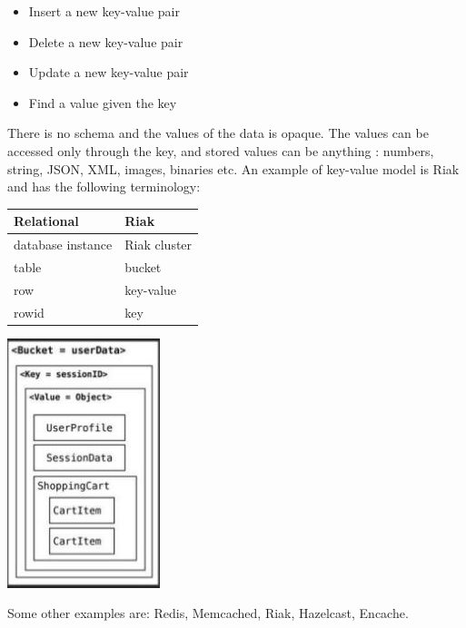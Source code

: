 \documentclass[a4page, 11pt]{article}
\begin{document}
\begin{itemize}[noitemsep]
	\item
	Insert a new key-value pair
	\item
	Delete a new key-value pair
	\item
	Update a new key-value pair
	\item
	Find a value given the key
\end{itemize}

There is no schema and the values of the data is opaque. The values can be accessed only through the key, and stored values can be anything : numbers, string, JSON, XML, images, binaries etc.
An example of key-value model is Riak and has the following terminology:
\begin{center}
	\begin{minipage}[b]{0.4\textwidth}
	\begin{tabular}{|l|l|}
		\hline
		\textbf{Relational} & \textbf{Riak}\\ \hline
		database instance & Riak cluster\\ \hline
		table & bucket \\ \hline
		row & key-value\\ \hline
		rowid & key\\ \hline
	\end{tabular}
	\end{minipage}
	\begin{minipage}{.5\textwidth}\centering
	\includegraphics[scale=0.6]{IMAGE4.jpg}
	\end{minipage}

\end{center}
Some other examples are: Redis, Memcached, Riak, Hazelcast, Encache.
\end{document}
